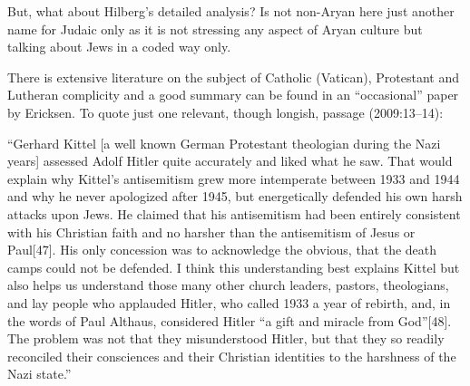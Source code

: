 But, what about Hilberg's detailed analysis? Is not non-Aryan here just another name for Judaic only as it is not stressing any aspect of Aryan culture but talking about Jews in a coded way only.

There is extensive literature on the subject of Catholic (Vatican), Protestant and Lutheran complicity and a good summary can be found in an “occasional” paper by Ericksen. To quote just one relevant, though longish, passage (2009:13--14):

\begin{myquote}
“Gerhard Kittel [a well known German Protestant theologian during the Nazi years] assessed Adolf Hitler quite accurately and liked what he saw. That would explain why Kittel’s antisemitism grew more intemperate between 1933 and 1944 and why he never apologized after 1945, but energetically defended his own harsh attacks upon Jews. He claimed that his antisemitism had been entirely consistent with his Christian faith and no harsher than the antisemitism of Jesus or Paul[47]. His only concession was to acknowledge the obvious, that the death camps could not be defended. I think this understanding best explains Kittel but also helps us understand those many other church leaders, pastors, theologians, and lay people who applauded Hitler, who called 1933 a year of rebirth, and, in the words of Paul Althaus, considered Hitler “a gift and miracle from God”[48]. The problem was not that they misunderstood Hitler, but that they so readily reconciled their consciences and their Christian identities to the harshness of the Nazi state.”


\end{myquote}
